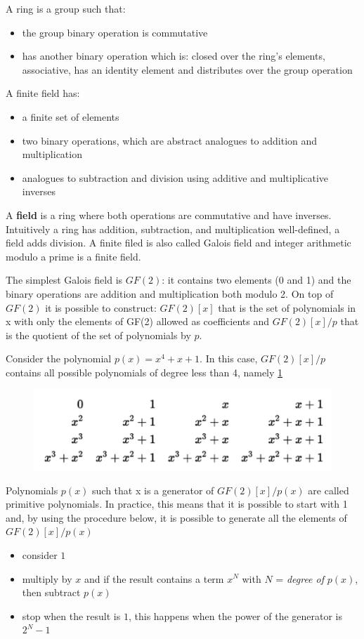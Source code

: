 A ring is a group such that:
\begin{itemize}
	\item the group binary operation is commutative
	\item has another binary operation which is: closed over the ring's elements, associative, has an identity element and distributes over the group operation
\end{itemize}

A finite field has:
\begin{itemize}
	\item a finite set of elements
	\item two binary operations, which are abstract analogues to addition and multiplication
	\item analogues to subtraction and division using additive and multiplicative inverses
\end{itemize}

A \textbf{field} is a ring where both operations are commutative and have inverses. Intuitively a ring has addition, subtraction, and multiplication well-defined, a field adds division. A finite filed is also called Galois field and integer arithmetic modulo a prime is a finite field.

The simplest Galois field is $GF(2)$: it contains two elements (0 and 1) and the binary operations are addition and multiplication both modulo 2. On top of $GF(2)$ it is possible to construct: $GF(2)[x]$ that is the set of polynomials in x with only the elements of GF(2) allowed as coefficients and $GF(2)[x]/p$ that is the quotient of the set of polynomials by $p$.

Consider the polynomial $p(x)= x^4 + x +1$. In this case, $GF(2)[x]/p$ contains all possible polynomials of degree less than 4, namely \ref{fig:chapter2_screenshot006}

\begin{figure}
	\centering
	\includegraphics[width=0.7\linewidth]{Images/Chapter2/screenshot006}
	\caption{}
	\label{fig:chapter2_screenshot006}
\end{figure}
Polynomials $p(x)$ such that x is a generator of $GF(2)[x]/p(x)$ are called primitive polynomials.
In practice, this means that it is possible to start with 1 and, by using the procedure
below, it is possible to generate all the elements of $GF(2)[x]/p(x)$
\begin{itemize}
	\item consider $1$
	\item multiply by $x$ and if the result contains a term $x^N$ with $N$ = \emph{degree of} $p(x)$, then subtract $p(x)$
	\item stop when the result is $1$, this happens when the power of the generator is $2^N - 1$
\end{itemize}

